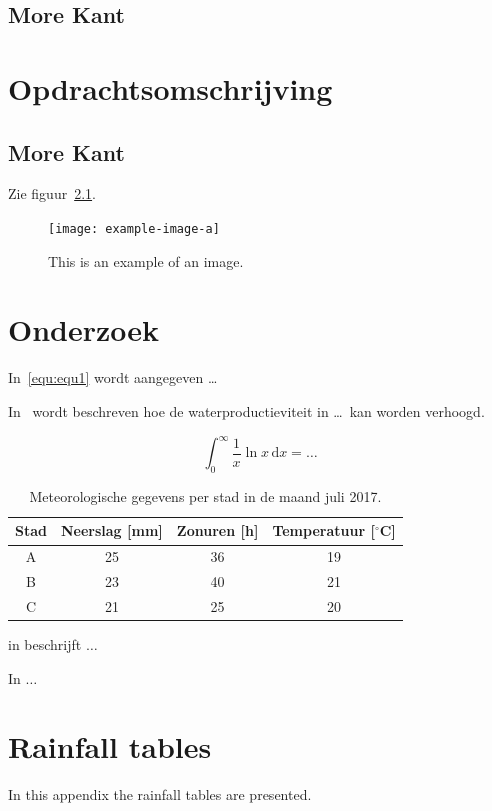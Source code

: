 \documentclass[a4paper,12pt]{book} %
\begin{document}
\section{More Kant}
\kant[1-6]

\chapter{Opdrachtsomschrijving}
\kant[7]
\section{More Kant}
\kant[8]

Zie figuur~\ref{fig:fig1}.

\begin{figure}[!ht]
\centering
\texttt{[image: example-image-a]}
\caption{This is an example of an image.}
\label{fig:fig1}
\end{figure}
\kant[9]

\chapter{Onderzoek}

\kant[1]
In~\eqref{equ:equ1} wordt aangegeven \ldots

In~\cite{oweis2003improving} wordt beschreven hoe de waterproductieviteit in \ldots\ kan worden verhoogd.

\begin{equation}
\label{equ:equ1}
\int_{0}^{\infty} \frac{1}{x}\ln x\, \mathrm{d}x = \ldots
\end{equation}

\begin{table}[!ht]
\centering
\caption{Meteorologische gegevens per stad in de maand juli 2017.}
\label{tab:my-table}
\begin{tabular}{@{}cccc@{}}
\toprule
Stad & Neerslag {[}mm{]} & Zonuren {[}h{]} & Temperatuur {[}$^{\circ}$C{]} \\ \midrule
A    & 25                & 36              & 19                  \\
B    & 23                & 40              & 21                  \\
C    & 21                & 25              & 20                  \\ \bottomrule
\end{tabular}
\end{table}

\citeauthor{sivanappan1995soil} in \cite{sivanappan1995soil} beschrijft $\ldots$

In \cite{turner2011agricultural} $\ldots$



\appendix

\chapter{Rainfall tables}
In this appendix the rainfall tables are presented.

\backmatter  %
\end{document}
